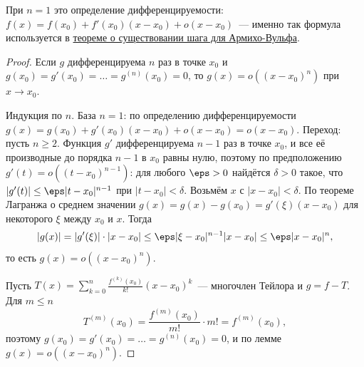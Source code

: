 

\begin{remark}
  При $n = 1$ это определение дифференцируемости: $f(x) = f(x_0) + f'(x_0)(x - x_0) + o(x - x_0)$~--- именно так формула используется в \hyperref[note:C143295F-C422-4FEE-95AD-3D6B620BC0E8]{теореме о существовании шага для Армихо-Вульфа}.
\end{remark}

\begin{proof}
  Если $g$ дифференцируема $n$ раз в точке $x_0$ и $g(x_0) = g'(x_0) = \ldots = g^{(n)}(x_0) = 0$, то $g(x) = o((x - x_0)^n)$ при $x \to x_0$.

  Индукция по $n$. База $n = 1$: по определению дифференцируемости $g(x) = g(x_0) + g'(x_0)(x - x_0) + o(x - x_0) = o(x - x_0)$.
  Переход: пусть $n \ge 2$. Функция $g'$ дифференцируема $n - 1$ раз в точке $x_0$, и все её производные до порядка $n - 1$ в $x_0$ равны нулю, поэтому по предположению $g'(t) = o((t - x_0)^{n-1})$: для любого $\eps > 0$ найдётся $\delta > 0$ такое, что $|g'(t)| \le \eps |t - x_0|^{n-1}$ при $|t - x_0| < \delta$.
  Возьмём $x$ с $|x - x_0| < \delta$. По теореме Лагранжа о среднем значении $g(x) = g(x) - g(x_0) = g'(\xi)(x - x_0)$ для некоторого $\xi$ между $x_0$ и $x$. Тогда
  \[|g(x)| = |g'(\xi)| \cdot |x - x_0| \le \eps |\xi - x_0|^{n-1} |x - x_0| \le \eps |x - x_0|^n,
  \]
  то есть $g(x) = o((x - x_0)^n)$.

  Пусть $T(x) = \sum_{k=0}^{n} \frac{f^{(k)}(x_0)}{k!} (x - x_0)^k$~--- многочлен Тейлора и $g = f - T$. Для $m \le n$
  \[
  T^{(m)}(x_0) = \frac{f^{(m)}(x_0)}{m!} \cdot m! = f^{(m)}(x_0),
  \]
  поэтому $g(x_0) = g'(x_0) = \ldots = g^{(n)}(x_0) = 0$, и по лемме $g(x) = o((x - x_0)^n)$.
\end{proof}
